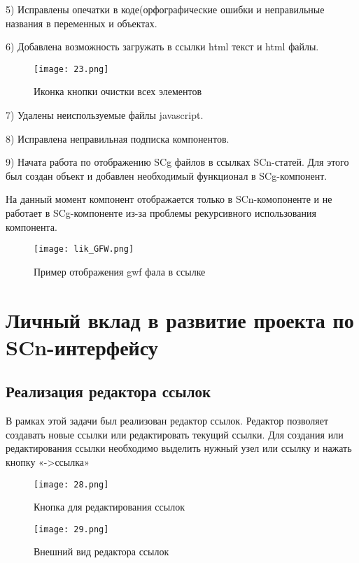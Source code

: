 5) Исправлены опечатки в коде(орфографические ошибки и неправильные названия в переменных и объектах.

6) Добавлена возможность загружать в ссылки html текст и html файлы.

\begin{figure}[H]
  \centering
  \texttt{[image: 23.png]}
  \caption{Иконка кнопки очистки всех элементов}
  \label{fig:hardware:sdr_pipeline}
\end{figure}

7) Удалены неиспользуемые файлы javascript.

8) Исправлена неправильная подписка компонентов.

9) Начата работа по отображению SCg файлов в ссылках SCn-статей.
Для этого был создан объект и добавлен необходимый функционал в SCg-компонент.

На данный момент компонент отображается только в  SCn-комопоненте и не работает в SCg-компоненте из-за проблемы рекурсивного использования компонента.

\begin{figure}[H]
  \centering
  \texttt{[image: lik\_GFW.png]}
  \caption{Пример отображения gwf фала в ссылке}
  \label{fig:hardware:sdr_pipeline}
\end{figure}

\newpage
\section{Личный вклад в развитие проекта по SCn-интерфейсу}
\label{sec:domain4}

\subsection{Реализация редактора ссылок}

В рамках этой задачи был реализован редактор ссылок. Редактор позволяет создавать новые ссылки или редактировать текущий ссылки. Для создания или редактирования ссылки необходимо выделить нужный узел или ссылку и нажать кнопку «->ссылка»

\begin{figure}[H]
  \centering
  \texttt{[image: 28.png]}
  \caption{Кнопка для редактирования ссылок}
  \label{fig:hardware:sdr_pipeline}
\end{figure}

\begin{figure}[H]
  \centering
  \texttt{[image: 29.png]}
  \caption{Внешний вид редактора ссылок}
  \label{fig:hardware:sdr_pipeline}
\end{figure}

